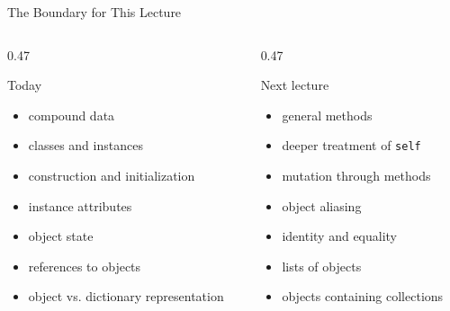 \documentclass[aspectratio=169,10pt]{beamer}
\begin{document}
\begin{frame}{The Boundary for This Lecture}
  \begin{columns}[T,onlytextwidth]
    \begin{column}{0.47\textwidth}
      \begin{block}{Today}
        \begin{itemize}
          \item compound data
          \item classes and instances
          \item construction and initialization
          \item instance attributes
          \item object state
          \item references to objects
          \item object vs. dictionary representation
        \end{itemize}
      \end{block}
    \end{column}
    \begin{column}{0.47\textwidth}
      \begin{alertblock}{Next lecture}
        \begin{itemize}
          \item general methods
          \item deeper treatment of \texttt{self}
          \item mutation through methods
          \item object aliasing
          \item identity and equality
          \item lists of objects
          \item objects containing collections
        \end{itemize}
      \end{alertblock}
    \end{column}
  \end{columns}
\end{frame}

\end{document}
